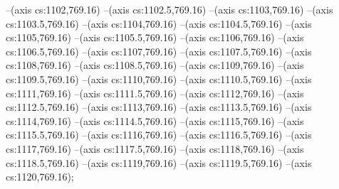 --(axis cs:1102,769.16)
--(axis cs:1102.5,769.16)
--(axis cs:1103,769.16)
--(axis cs:1103.5,769.16)
--(axis cs:1104,769.16)
--(axis cs:1104.5,769.16)
--(axis cs:1105,769.16)
--(axis cs:1105.5,769.16)
--(axis cs:1106,769.16)
--(axis cs:1106.5,769.16)
--(axis cs:1107,769.16)
--(axis cs:1107.5,769.16)
--(axis cs:1108,769.16)
--(axis cs:1108.5,769.16)
--(axis cs:1109,769.16)
--(axis cs:1109.5,769.16)
--(axis cs:1110,769.16)
--(axis cs:1110.5,769.16)
--(axis cs:1111,769.16)
--(axis cs:1111.5,769.16)
--(axis cs:1112,769.16)
--(axis cs:1112.5,769.16)
--(axis cs:1113,769.16)
--(axis cs:1113.5,769.16)
--(axis cs:1114,769.16)
--(axis cs:1114.5,769.16)
--(axis cs:1115,769.16)
--(axis cs:1115.5,769.16)
--(axis cs:1116,769.16)
--(axis cs:1116.5,769.16)
--(axis cs:1117,769.16)
--(axis cs:1117.5,769.16)
--(axis cs:1118,769.16)
--(axis cs:1118.5,769.16)
--(axis cs:1119,769.16)
--(axis cs:1119.5,769.16)
--(axis cs:1120,769.16);

